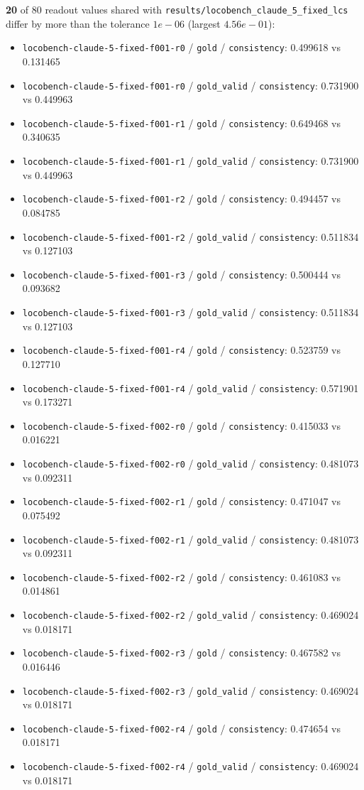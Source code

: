 \documentclass[11pt]{article}
\begin{document}
\textbf{20} of 80 readout values shared with \texttt{results/locobench\_claude\_5\_fixed\_lcs} differ by more than the tolerance $1e-06$ (largest $4.56e-01$):
\begin{itemize}
\item \texttt{locobench-claude-5-fixed-f001-r0} / \texttt{gold} / \texttt{consistency}: 0.499618 vs 0.131465
\item \texttt{locobench-claude-5-fixed-f001-r0} / \texttt{gold\_valid} / \texttt{consistency}: 0.731900 vs 0.449963
\item \texttt{locobench-claude-5-fixed-f001-r1} / \texttt{gold} / \texttt{consistency}: 0.649468 vs 0.340635
\item \texttt{locobench-claude-5-fixed-f001-r1} / \texttt{gold\_valid} / \texttt{consistency}: 0.731900 vs 0.449963
\item \texttt{locobench-claude-5-fixed-f001-r2} / \texttt{gold} / \texttt{consistency}: 0.494457 vs 0.084785
\item \texttt{locobench-claude-5-fixed-f001-r2} / \texttt{gold\_valid} / \texttt{consistency}: 0.511834 vs 0.127103
\item \texttt{locobench-claude-5-fixed-f001-r3} / \texttt{gold} / \texttt{consistency}: 0.500444 vs 0.093682
\item \texttt{locobench-claude-5-fixed-f001-r3} / \texttt{gold\_valid} / \texttt{consistency}: 0.511834 vs 0.127103
\item \texttt{locobench-claude-5-fixed-f001-r4} / \texttt{gold} / \texttt{consistency}: 0.523759 vs 0.127710
\item \texttt{locobench-claude-5-fixed-f001-r4} / \texttt{gold\_valid} / \texttt{consistency}: 0.571901 vs 0.173271
\item \texttt{locobench-claude-5-fixed-f002-r0} / \texttt{gold} / \texttt{consistency}: 0.415033 vs 0.016221
\item \texttt{locobench-claude-5-fixed-f002-r0} / \texttt{gold\_valid} / \texttt{consistency}: 0.481073 vs 0.092311
\item \texttt{locobench-claude-5-fixed-f002-r1} / \texttt{gold} / \texttt{consistency}: 0.471047 vs 0.075492
\item \texttt{locobench-claude-5-fixed-f002-r1} / \texttt{gold\_valid} / \texttt{consistency}: 0.481073 vs 0.092311
\item \texttt{locobench-claude-5-fixed-f002-r2} / \texttt{gold} / \texttt{consistency}: 0.461083 vs 0.014861
\item \texttt{locobench-claude-5-fixed-f002-r2} / \texttt{gold\_valid} / \texttt{consistency}: 0.469024 vs 0.018171
\item \texttt{locobench-claude-5-fixed-f002-r3} / \texttt{gold} / \texttt{consistency}: 0.467582 vs 0.016446
\item \texttt{locobench-claude-5-fixed-f002-r3} / \texttt{gold\_valid} / \texttt{consistency}: 0.469024 vs 0.018171
\item \texttt{locobench-claude-5-fixed-f002-r4} / \texttt{gold} / \texttt{consistency}: 0.474654 vs 0.018171
\item \texttt{locobench-claude-5-fixed-f002-r4} / \texttt{gold\_valid} / \texttt{consistency}: 0.469024 vs 0.018171
\end{itemize}
\end{document}
